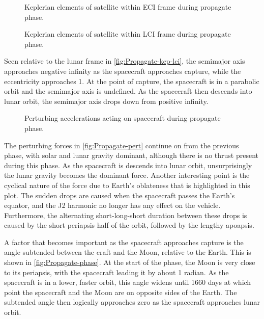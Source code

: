 \begin{figure}
\centering
\def\svgwidth{\figurewidth}

\caption{Keplerian elements of satellite within ECI frame during propagate phase.}
\label{fig:Propagate-kep}
\end{figure}

\begin{figure}
\centering
\def\svgwidth{\figurewidth}

\caption{Keplerian elements of satellite within LCI frame during propagate phase.}
\label{fig:Propagate-kep-lci}
\end{figure}

Seen relative to the lunar frame in \autoref{fig:Propagate-kep-lci}, the semimajor axis approaches negative infinity as the spacecraft approaches capture, while the eccentricity approaches 1. At the point of capture, the spacecraft is in a parabolic orbit and the semimajor axis is undefined. As the spacecraft then descends into lunar orbit, the semimajor axis drops down from positive infinity.

\begin{figure}
\centering
\def\svgwidth{\figurewidth}

\caption{Perturbing accelerations acting on spacecraft during propagate phase.}
\label{fig:Propagate-pert}
\end{figure}

The perturbing forces in \autoref{fig:Propagate-pert} continue on from the previous phase, with solar and lunar gravity dominant, although there is no thrust present during this phase. As the spacecraft is descends into lunar orbit, unsurprisingly the lunar gravity becomes the dominant force. Another interesting point is the cyclical nature of the force due to Earth's oblateness that is highlighted in this plot. The sudden drops are caused when the spacecraft passes the Earth's equator, and the J2 harmonic no longer has any effect on the vehicle. Furthermore, the alternating short-long-short duration between these drops is caused by the short periapsis half of the orbit, followed by the lengthy apoapsis.

%

A factor that becomes important as the spacecraft approaches capture is the angle subtended between the craft and the Moon, relative to the Earth. This is shown in \autoref{fig:Propagate-phase}. At the start of the phase, the Moon is very close to its periapsis, with the spacecraft leading it by about 1 radian. As the spacecraft is in a lower, faster orbit, this angle widens until 1660 days at which point the spacecraft and the Moon are on opposite sides of the Earth. The subtended angle then logically approaches zero as the spacecraft approaches lunar orbit.

